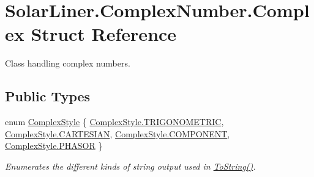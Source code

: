 \hypertarget{struct_solar_liner_1_1_complex_number_1_1_complex}{}\section{Solar\+Liner.\+Complex\+Number.\+Complex Struct Reference}
\label{struct_solar_liner_1_1_complex_number_1_1_complex}


Class handling complex numbers.  


\subsection*{Public Types}
\begin{DoxyCompactItemize}
\item 
enum \hyperlink{struct_solar_liner_1_1_complex_number_1_1_complex_af40acfb18b45366e7f1e66f752b8dc7d}{Complex\+Style} \{ \hyperlink{struct_solar_liner_1_1_complex_number_1_1_complex_af40acfb18b45366e7f1e66f752b8dc7daadf62a9e4cc8426fba802a7e46cb1260}{Complex\+Style.\+T\+R\+I\+G\+O\+N\+O\+M\+E\+T\+R\+IC}, 
\hyperlink{struct_solar_liner_1_1_complex_number_1_1_complex_af40acfb18b45366e7f1e66f752b8dc7dac02304094f2866a43251b12946a9a21b}{Complex\+Style.\+C\+A\+R\+T\+E\+S\+I\+AN}, 
\hyperlink{struct_solar_liner_1_1_complex_number_1_1_complex_af40acfb18b45366e7f1e66f752b8dc7da7fc67f9f99bcdc7656908ef20801d05b}{Complex\+Style.\+C\+O\+M\+P\+O\+N\+E\+NT}, 
\hyperlink{struct_solar_liner_1_1_complex_number_1_1_complex_af40acfb18b45366e7f1e66f752b8dc7da5fed0d8494ac21e60020e3f2c1e394e4}{Complex\+Style.\+P\+H\+A\+S\+OR}
 \}\begin{DoxyCompactList}\small\item\em Enumerates the different kinds of string output used in \hyperlink{struct_solar_liner_1_1_complex_number_1_1_complex_a14ea2f3707b23006729eeac62484a556}{To\+String()}. \end{DoxyCompactList}
\end{DoxyCompactItemize}
